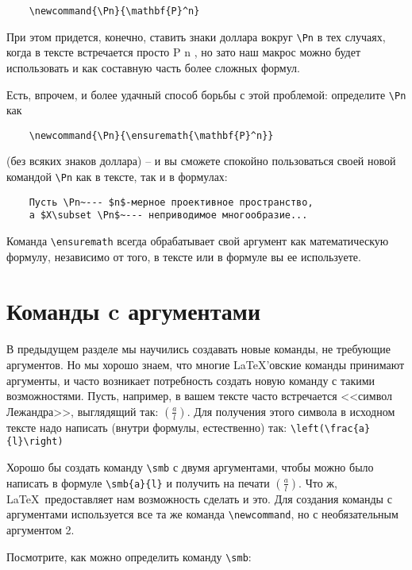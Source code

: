 \begin{verbatim}
	\newcommand{\Pn}{\mathbf{P}^n}
\end{verbatim}

При этом придется, конечно, ставить знаки доллара вокруг \verb"\Pn" в тех случаях, когда в тексте встречается просто P n , но зато наш макрос можно будет использовать и как составную часть более сложных формул.

Есть, впрочем, и более удачный способ борьбы с этой проблемой: определите \verb"\Pn" как

\begin{verbatim}
	\newcommand{\Pn}{\ensuremath{\mathbf{P}^n}}
\end{verbatim}

(без всяких знаков доллара) -- и вы сможете спокойно пользоваться своей новой командой \verb"\Pn" как в тексте, так и в формулах:

\begin{verbatim}
	Пусть \Pn~--- $n$-мерное проективное пространство,
	а $X\subset \Pn$~--- неприводимое многообразие...
\end{verbatim}

Команда \verb"\ensuremath" всегда обрабатывает свой аргумент как математическую формулу, независимо от того, в тексте или в формуле вы ее используете.

\section{Команды c аргументами}

В предыдущем разделе мы научились создавать новые команды, не требующие аргументов. Но мы хорошо знаем, что многие \LaTeX ’овские команды принимают аргументы, и часто возникает потребность создать новую команду с такими возможностями. Пусть, например, в вашем тексте часто встречается <<символ Лежандра>>, выглядящий так: $\left(\frac{a}{l}\right)$. Для получения этого символа в исходном тексте надо написать (внутри формулы, естественно) так: \verb"\left(\frac{a}{l}\right)"

Хорошо бы создать команду \verb"\smb" с двумя аргументами, чтобы можно было написать в формуле \verb"\smb{a}{l}" и получить на печати $\left(\frac{a}{l}\right)$. Что ж, \LaTeX\ предоставляет нам возможность сделать и это. Для создания команды с аргументами используется все та же команда \verb"\newcommand", но с необязательным аргументом 2.

Посмотрите, как можно определить команду \verb"\smb":

